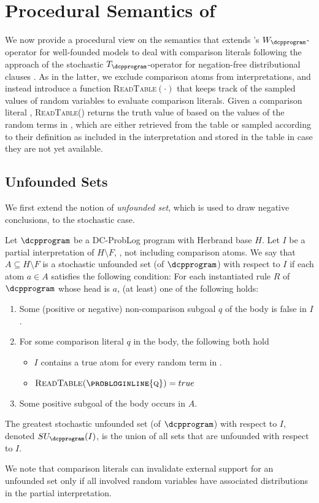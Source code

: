 \section{Procedural Semantics of \dcproblogsty}\label{sec:swp}
We now provide a procedural view on the semantics that extends \citet{van1991well}'s $W_\dcpprogram$-operator for well-founded models to deal with comparison literals following the approach of the stochastic $T_\dcpprogram$-operator for negation-free distributional clauses \citep{gutmann2011magic}. As in the latter, we exclude comparison atoms from interpretations, and instead introduce a function \textsc{ReadTable}$(\cdot)$ that keeps track of the sampled values of random variables to evaluate comparison literals. Given a comparison literal , \textsc{ReadTable()}  returns the truth value of  based on the values of the random terms  in , which are either retrieved from the table or sampled according to their definition  as included in the interpretation and stored in the table in case they are not yet available. 

\subsection{Unfounded Sets}

We first extend the notion of \emph{unfounded set}, which is used to draw negative conclusions, to the stochastic case.
\begin{definition}
	Let $\dcpprogram$ be a DC-ProbLog program with Herbrand base $H$. Let $I$ be a partial interpretation of  $H\setminus F$, \ie, not including comparison atoms. 
	We say that  $A\subseteq H\setminus F$ is a stochastic unfounded set (of $\dcpprogram$) with respect to $I$ if each atom $a\in A$ satisfies the following condition: For each instantiated rule $R$ of $\dcpprogram$ whose head is $a$, (at least) one of the following holds:
	\begin{enumerate}
		\item Some (positive or negative) non-comparison subgoal $q$ of the body is false in $I$.
		\item For some comparison literal $q$ in the body, the following both hold
		\begin{itemize}
			\item $I$ contains  a true atom  for every random term  in .
			\item $\textsc{ReadTable(\probloginline{q})}=true$
		\end{itemize}
		\item Some positive subgoal of the body occurs in $A$.
	\end{enumerate}
	The greatest stochastic unfounded set (of $\dcpprogram$) with respect to $I$, denoted $SU_\dcpprogram(I)$, is the union of all sets that are unfounded with respect to $I$.
\end{definition}
We note that comparison literals can invalidate external support for an unfounded set only if all involved random variables have associated distributions in the partial interpretation. 

